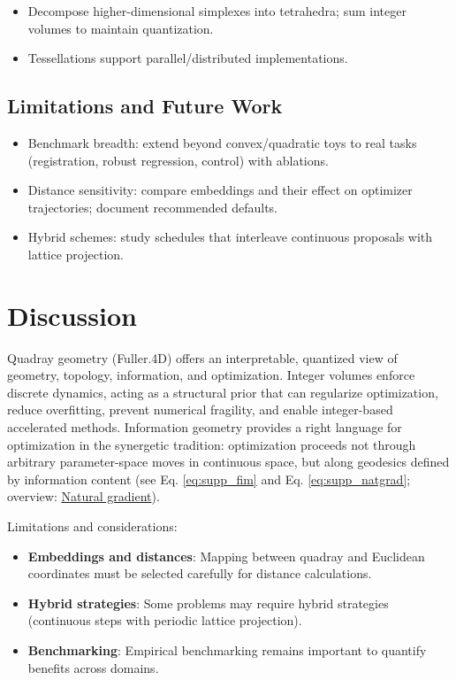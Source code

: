 \documentclass[
  10pt,
]{article}
\providecommand{\tightlist}{%
  \setlength{\itemsep}{0pt}\setlength{\parskip}{0pt}}
\begin{document}
\begin{itemize}
\tightlist
\item
  Decompose higher-dimensional simplexes into tetrahedra; sum integer
  volumes to maintain quantization.
\item
  Tessellations support parallel/distributed implementations.
\end{itemize}

\hypertarget{limitations-and-future-work}{%
\subsection{Limitations and Future
Work}\label{limitations-and-future-work}}

\begin{itemize}
\tightlist
\item
  Benchmark breadth: extend beyond convex/quadratic toys to real tasks
  (registration, robust regression, control) with ablations.
\item
  Distance sensitivity: compare embeddings and their effect on optimizer
  trajectories; document recommended defaults.
\item
  Hybrid schemes: study schedules that interleave continuous proposals
  with lattice projection. 
\end{itemize}

\hypertarget{discussion}{%
\section{Discussion}\label{discussion}}

Quadray geometry (Fuller.4D) offers an interpretable, quantized view of
geometry, topology, information, and optimization. Integer volumes
enforce discrete dynamics, acting as a structural prior that can
regularize optimization, reduce overfitting, prevent numerical
fragility, and enable integer-based accelerated methods. Information
geometry provides a right language for optimization in the synergetic
tradition: optimization proceeds not through arbitrary parameter-space
moves in continuous space, but along geodesics defined by information
content (see Eq. \eqref{eq:supp_fim} and Eq. \eqref{eq:supp_natgrad};
overview: \href{https://en.wikipedia.org/wiki/Natural_gradient}{Natural
gradient}).

Limitations and considerations:

\begin{itemize}
\tightlist
\item
  \textbf{Embeddings and distances}: Mapping between quadray and
  Euclidean coordinates must be selected carefully for distance
  calculations.
\item
  \textbf{Hybrid strategies}: Some problems may require hybrid
  strategies (continuous steps with periodic lattice projection).
\item
  \textbf{Benchmarking}: Empirical benchmarking remains important to
  quantify benefits across domains.
\end{itemize}
\end{document}
